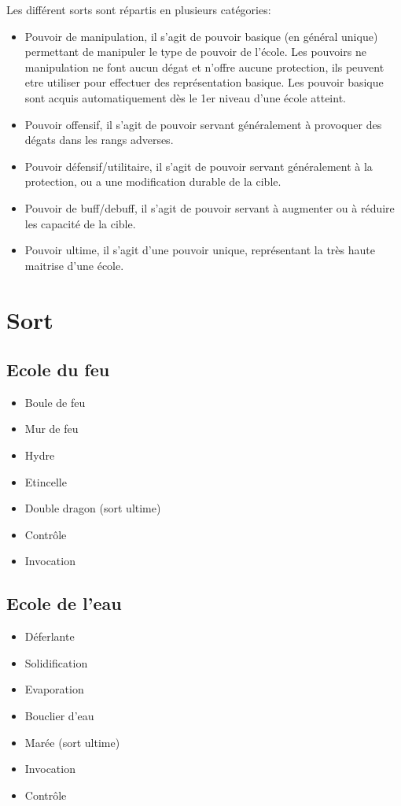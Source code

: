 Les différent sorts sont répartis en plusieurs catégories:
\begin{itemize}
\item Pouvoir de manipulation, il s'agit de pouvoir basique (en général unique) permettant de manipuler le type de pouvoir de l'école. Les pouvoirs ne manipulation ne font aucun dégat et n'offre aucune protection, ils peuvent etre utiliser pour effectuer des représentation basique. Les pouvoir basique sont acquis automatiquement dès le 1er niveau d'une école atteint.
\item Pouvoir offensif, il s'agit de pouvoir servant généralement à provoquer des dégats dans les rangs adverses. 
\item Pouvoir défensif/utilitaire, il s'agit de pouvoir servant généralement à la protection, ou a une modification durable de la cible.
\item Pouvoir de buff/debuff, il s'agit de pouvoir servant à augmenter ou à réduire les capacité de la cible.
\item Pouvoir ultime, il s'agit d'une pouvoir unique, représentant la très haute maitrise d'une école.
\end{itemize}
\section{Sort}



\subsection{Ecole du feu}
\begin{itemize}
\item Boule de feu
\item Mur de feu
\item Hydre
\item Etincelle
\item Double dragon (sort ultime)
\item Contrôle
\item Invocation
\end{itemize}

\subsection{Ecole de l'eau}
\begin{itemize}
\item Déferlante
\item Solidification
\item Evaporation
\item Bouclier d'eau
\item Marée (sort ultime)
\item Invocation
\item Contrôle
\end{itemize}

